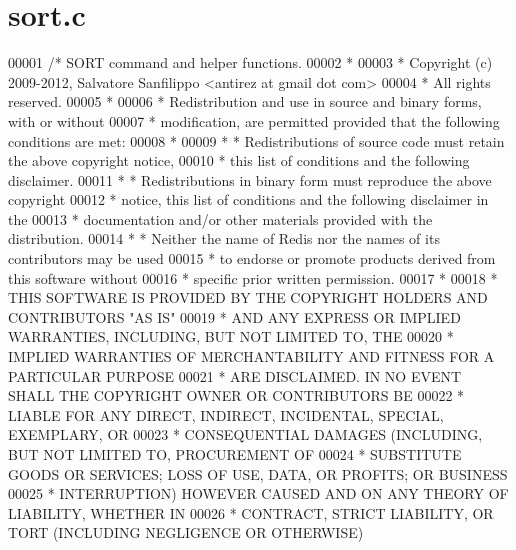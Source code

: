 \hypertarget{sort_8c_source}{}\section{sort.\+c}
\label{sort_8c_source}

\begin{DoxyCode}
00001 \textcolor{comment}{/* SORT command and helper functions.}
00002 \textcolor{comment}{ *}
00003 \textcolor{comment}{ * Copyright (c) 2009-2012, Salvatore Sanfilippo <antirez at gmail dot com>}
00004 \textcolor{comment}{ * All rights reserved.}
00005 \textcolor{comment}{ *}
00006 \textcolor{comment}{ * Redistribution and use in source and binary forms, with or without}
00007 \textcolor{comment}{ * modification, are permitted provided that the following conditions are met:}
00008 \textcolor{comment}{ *}
00009 \textcolor{comment}{ *   * Redistributions of source code must retain the above copyright notice,}
00010 \textcolor{comment}{ *     this list of conditions and the following disclaimer.}
00011 \textcolor{comment}{ *   * Redistributions in binary form must reproduce the above copyright}
00012 \textcolor{comment}{ *     notice, this list of conditions and the following disclaimer in the}
00013 \textcolor{comment}{ *     documentation and/or other materials provided with the distribution.}
00014 \textcolor{comment}{ *   * Neither the name of Redis nor the names of its contributors may be used}
00015 \textcolor{comment}{ *     to endorse or promote products derived from this software without}
00016 \textcolor{comment}{ *     specific prior written permission.}
00017 \textcolor{comment}{ *}
00018 \textcolor{comment}{ * THIS SOFTWARE IS PROVIDED BY THE COPYRIGHT HOLDERS AND CONTRIBUTORS "AS IS"}
00019 \textcolor{comment}{ * AND ANY EXPRESS OR IMPLIED WARRANTIES, INCLUDING, BUT NOT LIMITED TO, THE}
00020 \textcolor{comment}{ * IMPLIED WARRANTIES OF MERCHANTABILITY AND FITNESS FOR A PARTICULAR PURPOSE}
00021 \textcolor{comment}{ * ARE DISCLAIMED. IN NO EVENT SHALL THE COPYRIGHT OWNER OR CONTRIBUTORS BE}
00022 \textcolor{comment}{ * LIABLE FOR ANY DIRECT, INDIRECT, INCIDENTAL, SPECIAL, EXEMPLARY, OR}
00023 \textcolor{comment}{ * CONSEQUENTIAL DAMAGES (INCLUDING, BUT NOT LIMITED TO, PROCUREMENT OF}
00024 \textcolor{comment}{ * SUBSTITUTE GOODS OR SERVICES; LOSS OF USE, DATA, OR PROFITS; OR BUSINESS}
00025 \textcolor{comment}{ * INTERRUPTION) HOWEVER CAUSED AND ON ANY THEORY OF LIABILITY, WHETHER IN}
00026 \textcolor{comment}{ * CONTRACT, STRICT LIABILITY, OR TORT (INCLUDING NEGLIGENCE OR OTHERWISE)}

\end{DoxyCode}
